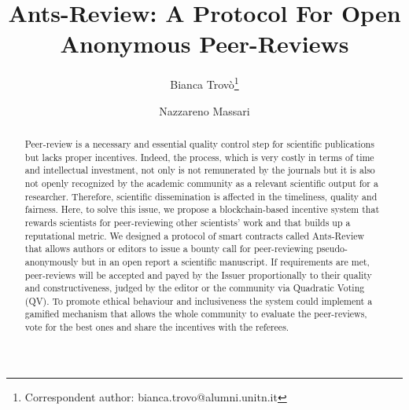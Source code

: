 \documentclass[runningheads]{llncs}
\begin{document}
%
\title{Ants-Review: A Protocol For Open Anonymous Peer-Reviews}
%
%
\author{Bianca Trovò\thanks{Correspondent author: bianca.trovo@alumni.unitn.it} \and
Nazzareno Massari}
%
%
%
\maketitle              %
%
\begin{abstract}
Peer-review is a necessary and essential quality control step for scientific publications but lacks proper  incentives. Indeed, the process, which is very costly in terms of time and intellectual investment, not only is not remunerated by the journals but it is also not openly recognized by the academic community as a relevant scientific output for a researcher. Therefore, scientific dissemination is affected in the timeliness, quality and fairness. Here, to solve this issue, we propose a blockchain-based incentive system that rewards scientists for peer-reviewing other scientists’ work and that builds up a reputational metric. We designed a protocol of smart contracts called Ants-Review that allows authors or editors to issue a bounty call for peer-reviewing pseudo-anonymously but in an open report a scientific manuscript. If requirements are met, peer-reviews will be accepted and payed by the Issuer proportionally to their quality and  constructiveness, judged by the editor or the community via Quadratic Voting (QV). To promote ethical behaviour and inclusiveness the system could implement a gamified mechanism that allows the whole community to evaluate the peer-reviews, vote for the best ones and share the incentives with the referees.
\end{abstract}
%
%
\end{document}
